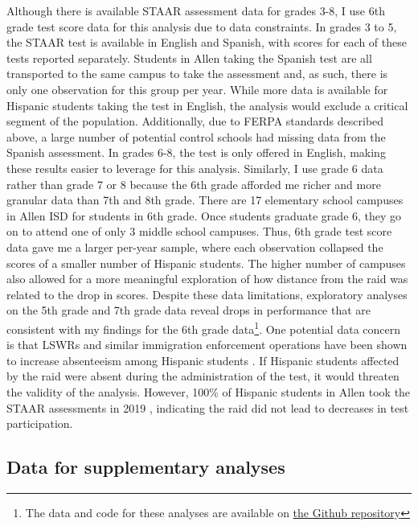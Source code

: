 \documentclass[hidelinks,twoside]{article}
\begin{document}
Although there is available STAAR assessment data for grades 3-8, I use 6th grade test score data for this analysis due to data constraints. In grades 3 to 5, the STAAR test is available in English and Spanish, with scores for each of these tests reported separately. Students in Allen taking the Spanish test are all transported to the same campus to take the assessment and, as such, there is only one observation for this group per year. While more data is available for Hispanic students taking the test in English, the analysis would exclude a critical segment of the population. Additionally, due to FERPA standards described above, a large number of potential control schools had missing data from the Spanish assessment. In grades 6-8, the test is only offered in English, making these results easier to leverage for this analysis. Similarly, I use grade 6 data rather than grade 7 or 8 because the 6th grade afforded me richer and more granular data than 7th and 8th grade. There are 17 elementary school campuses in Allen ISD for students in 6th grade. Once students graduate grade 6, they go on to attend one of only 3 middle school campuses. Thus, 6th grade test score data gave me a larger per-year sample, where each observation collapsed the scores of a smaller number of Hispanic students. The higher number of campuses also allowed for a more meaningful exploration of how distance from the raid was related to the drop in scores. Despite these data limitations, exploratory analyses on the 5th grade and 7th grade data reveal drops in performance that are consistent with my findings for the 6th grade data\footnote{The data and code for these analyses are available on \href{https://github.com/sofiaaj/texas_workplace_raid}{the Github repository}}. One potential data concern is that LSWRs and similar immigration enforcement operations have been shown to increase absenteeism among Hispanic students \citep{cervantes_2020_the,bellows_2021_the}. If Hispanic students affected by the raid were absent during the administration of the test, it would threaten the validity of the analysis. However, 100\% of Hispanic students in Allen took the STAAR assessments in 2019 \citep{texaseducationagency_2019_texas}, indicating the raid did not lead to decreases in test participation.

\subsection*{Data for supplementary analyses}
\end{document}
